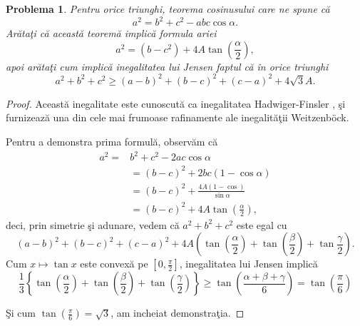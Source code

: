 \documentclass[a4paper,12pt,oneside]{report}
\newtheorem{problem}{Problema}
\begin{document}
\begin{problem}
Pentru orice triunghi, teorema cosinusului care ne spune c\u{a}
\begin{displaymath}
  a^{2} = b^{2}+ c^{2} - abc\cos\alpha.
\end{displaymath}
Ar\u{a}ta\c{t}i c\u{a} aceast\u{a} teorem\u{a} implic\u{a} formula ariei
\begin{displaymath}
  a^{2} = \left ( b - c^{2} \right ) + 4 A\tan \left ( \frac{\alpha }{2} \right ),
\end{displaymath}
apoi ar\u{a}ta\c{t}i cum implic\u{a} inegalitatea lui Jensen faptul c\u{a} \^{i}n orice triunghi
\begin{displaymath}
  a^{2} + b^{2} + c^{2} \geq  \left ( a - b  \right )^{2} + \left ( b- c  \right )^{2} + \left ( c - a \right )^{2} + 4\sqrt{3}A.
\end{displaymath}
\end{problem}
\begin{proof}
Aceast\u{a} inegalitate este cunoscut\u{a} ca inegalitatea Hadwiger-Finsler , \c{s}i furnizeaz\u{a} una din cele mai frumoase rafinamente ale inegalit\u{a}\c{t}ii Weitzenböck.

Pentru a demonstra prima formul\u{a}, observ\u{a}m c\u{a}
\begin{equation} \nonumber
    \begin{split}
        a^{2} = & b^{2} + c^{2} - 2ac\cos\alpha \\ &  = \left (  b - c \right )^{2} + 2bc\left ( 1 - \cos\alpha  \right ) \\ & =\left ( b - c \right )^{2} + \frac{4A\left ( 1 - \cos  \right )}{\sin \alpha } \\ &   = \left ( b - c \right )^{2} + 4A\tan\left ( \frac{\alpha }{2} \right ),
    \end{split}
\end{equation}
deci, prin simetrie \c{s}i adunare, vedem c\u{a}
\(a^{2} + b^{2} + c^{2}\) este egal cu
\begin{displaymath}
  \left ( a - b  \right )^{2} + \left ( b - c \right )^{2} + \left ( c - a  \right )^{2} + 4A\left ( \tan\left ( \frac{\alpha }{2} \right ) + \tan\left ( \frac{\beta }{2} \right ) + \tan \frac{\gamma }{2} \right ).
\end{displaymath}
  Cum \(x \mapsto \tan x\) este convex\u{a} pe \(\left [ 0 , \frac{\pi }{2} \right ]\), inegalitatea lui Jensen implic\u{a}
\begin{displaymath}
  \frac{1}{3}\left \{ \tan \left ( \frac{\alpha }{2} \right ) + \tan \left ( \frac{\beta }{2} \right )  + \tan \left ( \frac{\gamma }{2} \right )\right \} \geq  \tan\left ( \frac{\alpha  + \beta  + \gamma }{6} \right ) = \tan \left ( \frac{\pi }{6} \right)
\end{displaymath}

\c{S}i cum \(\tan \left ( \frac{\pi }{6} \right ) = \sqrt{3}\),  am incheiat demonstra\c{t}ia.
\end{proof}
\end{document}
